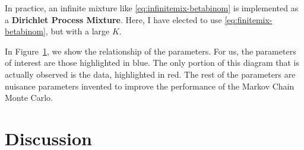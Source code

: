 \documentclass{article}
\begin{document}
In practice, an infinite mixture like \eqref{eq:infinitemix-betabinom} is implemented as a \textbf{Dirichlet Process Mixture}. Here, I have elected to use \eqref{eq:finitemix-betabinom}, but with a large $K$.

\begin{figure}
\centering
{}
\label{fig:diagram}
\end{figure}


In Figure~\ref{fig:diagram}, we show the relationship of the parameters. For us, the parameters of interest are those highlighted in blue. The only portion of this diagram that is actually observed is the data, highlighted in red. The rest of the parameters are nuisance parameters invented to improve the performance of the Markov Chain Monte Carlo.



\section{Discussion}
\end{document}

